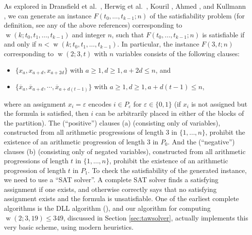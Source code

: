 \documentclass[final,3p,times]{elsarticle}
\theoremstyle{definition}
\newcommand{\set}[1]{\{#1\}}
\renewcommand{\leq}{\le} %
\newcommand{\ol}{\overline}
\DeclareMathOperator{\vdw}{w}
\begin{document}
As explored in Dransfield et al.\ \cite{dransfield}, Herwig et al.\ \cite{herwig}, Kouril \cite{KourilPaulW26,Kouril2012W34}, Ahmed \cite{ahmed2009, ahmed2010}, and Kullmann \cite{kullmann0,kullmann}, we can generate an instance $F(t_0,\dots,t_{k-1};n)$ of the satisfiability problem (for definition, see any of the above references) corresponding to $\vdw(k; t_0, t_1,\ldots, t_{k-1})$ and integer $n$, such that $F(t_0,\dots,t_{k-1};n)$ is satisfiable if and only if $n<\vdw(k; t_0, t_1,\ldots, t_{k-1})$.
In particular, the instance $F(3,t;n)$ corresponding to $\vdw(2; 3, t)$ with $n$ variables consists of the following clauses:
\begin{itemize}
\item[(a)] $\set{x_{a}, x_{a+d}, x_{a+2d}}$ with
         $a\geq{1}, d\geq{1}, a+2d\leq{n}$, and
\item[(b)] $\set{\ol{x}_{a}, \ol{x}_{a+d}, \cdots, \ol{x}_{a+d(t-1)}}$ with
         $a\geq{1}, d\geq{1}, a+d(t-1)\leq{n}$,
\end{itemize}
where an assignment $x_i = \varepsilon$ encodes $i \in P_{\varepsilon}$ for $\varepsilon \in \set{0,1}$
(if $x_i$ is not assigned but the formula is satisfied, then $i$ can be arbitrarily placed in either of the
blocks of the partition). The (``positive'') clauses (a) (consisting only of variables), constructed from all arithmetic progressions of length $3$ in $\set{1,\dots,n}$, prohibit the existence of an arithmetic progression of length $3$ in $P_0$. And the (``negative'') clauses (b) (consisting only of negated variables), constructed from all arithmetic progressions of length $t$ in $\set{1,\dots,n}$, prohibit the existence of an arithmetic progression of length $t$ in $P_1$. To check the satisfiability of the generated instance, we need to use a ``SAT solver''. A complete SAT solver finds a satisfying assignment if one exists, and otherwise correctly says that no satisfying assignment exists and the formula is unsatisfiable. One of the earliest complete algorithms is the DLL algorithm (\cite{dpll}), and our algorithm for computing $\vdw(2; 3, 19) \leq 349$, discussed in Section \ref{sec:tawsolver}, actually implements this very basic scheme, using modern heuristics.
\end{document}
